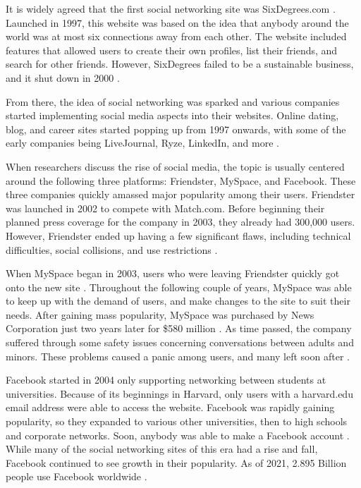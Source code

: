 \documentclass[12pt, journal, compsoc]{IEEEtran}
\begin{document}
\hspace{12pt} It is widely agreed that the first social networking site was SixDegrees.com \cite{History}. Launched in 1997, this  website was based on the idea that anybody around the world was at most six connections away from each other. The website included features that allowed users to create their own profiles, list their friends, and search for other friends. However, SixDegrees failed to be a sustainable business, and it shut down in 2000 \cite{History}.

From there, the idea of social networking was sparked and various companies started implementing social media aspects into their websites. Online dating, blog, and career sites started popping up from 1997 onwards, with some of the early companies being LiveJournal, Ryze, LinkedIn, and more \cite{History}. 

When researchers discuss the rise of social media, the topic is usually centered around the following three platforms: Friendster, MySpace, and Facebook. These three companies quickly amassed major popularity among their users. Friendster was launched in 2002 to compete with Match.com. Before beginning their planned press coverage for the company in 2003, they already had 300,000 users. However, Friendster ended up having a few significant flaws, including technical difficulties, social collisions, and use restrictions \cite{History}.

When MySpace began in 2003, users who were leaving Friendster quickly got onto the new site \cite{History}. Throughout the following couple of years, MySpace was able to keep up with the demand of users, and make changes to the site to suit their needs. After gaining mass popularity, MySpace was purchased by News Corporation just two years later for \$580 million \cite{History}. As time passed, the company suffered through some safety issues concerning conversations between adults and minors. These problems caused a panic among users, and many left soon after \cite{History}. 

Facebook started in 2004 only supporting networking between students at universities. Because of its beginnings in Harvard, only users with a harvard.edu email address were able to access the website. Facebook was rapidly gaining popularity, so they expanded to various other universities, then to high schools and corporate networks. Soon, anybody was able to make a Facebook account \cite{History}. While many of the social networking sites of this era had a rise and fall, Facebook continued to see growth in their popularity. As of 2021, 2.895 Billion people use Facebook worldwide \cite{MostPopular}.
\end{document}
